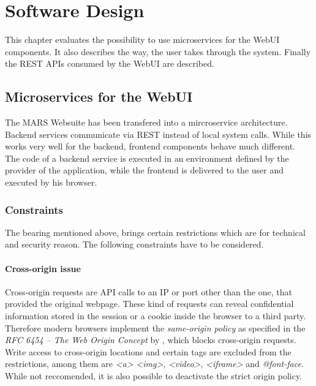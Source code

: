 
\chapter{Software Design}
This chapter evaluates the possibility to use microservices for the WebUI components. It also describes the way, the user takes through the system. Finally the REST APIs consumed by the WebUI are described.



\section{Microservices for the WebUI}
The MARS Websuite has been transfered into a mircroservice architecture. Backend services communicate via REST instead of local system calls. While this works very well for the backend, frontend components behave much different.\\
The code of a backend service is executed in an environment defined by the provider of the application, while the frontend is delivered to the user and executed by his browser.


\subsection{Constraints}
The bearing mentioned above, brings certain restrictions which are for technical and security reason. The following constraints have to be considered.

\subsubsection{Cross-origin issue}
Cross-origin requests are API calls to an IP or port other than the one, that provided the original webpage. These kind of requests can reveal confidential information stored in the session or a cookie inside the browser to a third party.\\
Therefore modern browsers implement the \textit{same-origin policy} as specified in the \textit{RFC 6454 -- The Web Origin Concept} by \cite{barth2011web}, which blocks cross-origin requests.\\
Write access to cross-origin locations and certain tags are excluded from the restrictions, among them are \textit{<a>} \textit{<img>}, \textit{<video>}, \textit{<iframe>} and \textit{@font-face}. While not reccomended, it is also possible to deactivate the strict origin policy.

